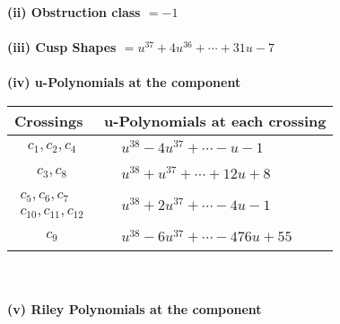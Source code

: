 \documentclass[1p]{elsarticle_modified}
\theoremstyle{definition}
\begin{document}
\flushleft \textbf{(ii) Obstruction class $= -1$}\\~\\
\flushleft \textbf{(iii) Cusp Shapes $= u^{37}+4 u^{36}+\cdots+31 u-7$}\\~\\
\newpage\renewcommand{\arraystretch}{1}
\flushleft \textbf{(iv) u-Polynomials at the component}\newline \\
\begin{tabular}{m{50pt}|m{274pt}}
Crossings & \hspace{64pt}u-Polynomials at each crossing \\
\hline $$\begin{aligned}c_{1},c_{2},c_{4}\end{aligned}$$&$\begin{aligned}
&u^{38}-4 u^{37}+\cdots- u-1
\end{aligned}$\\
\hline $$\begin{aligned}c_{3},c_{8}\end{aligned}$$&$\begin{aligned}
&u^{38}+u^{37}+\cdots+12 u+8
\end{aligned}$\\
\hline $$\begin{aligned}c_{5},c_{6},c_{7}\\c_{10},c_{11},c_{12}\end{aligned}$$&$\begin{aligned}
&u^{38}+2 u^{37}+\cdots-4 u-1
\end{aligned}$\\
\hline $$\begin{aligned}c_{9}\end{aligned}$$&$\begin{aligned}
&u^{38}-6 u^{37}+\cdots-476 u+55
\end{aligned}$\\
\hline
\end{tabular}\\~\\
\newpage\renewcommand{\arraystretch}{1}
\flushleft \textbf{(v) Riley Polynomials at the component}\newline \\
\end{document}
